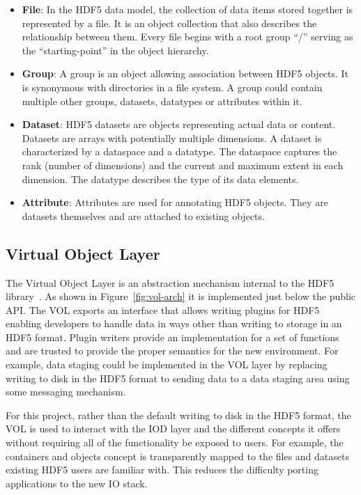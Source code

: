 \documentclass[conference]{IEEEtran}
\begin{document}
\begin{itemize}

\item
  \textbf{File}: In the HDF5 data model, the collection of data items stored
  together is represented by a file. It is an object collection that also
  describes the relationship between them. Every file begins with a root
  group ``/'' serving as the ``starting-point'' in the object hierarchy.

\item
  \textbf{Group}: A group is an object allowing association between HDF5
  objects. It is synonymous with directories in a file system. A group
  could contain multiple other groups, datasets, datatypes or attributes within
  it.

\item
  \textbf{Dataset}: HDF5 datasets are objects representing actual data
  or content. Datasets are arrays with potentially multiple dimensions. A
  dataset is characterized by a dataspace and a datatype. The dataspace
  captures the rank (number of dimensions) and the current and maximum
  extent in each dimension. The datatype describes the type of its data
  elements.

\item
  \textbf{Attribute}: Attributes are used for annotating HDF5 objects. They are
  datasets themselves and are attached to existing objects.

\end{itemize}

\subsection{Virtual Object Layer}
\label{virtual-object-layer}

The Virtual Object Layer is an abstraction mechanism internal to the HDF5
library~\cite{hdf5}. As shown in Figure~\ref{fig:vol-arch} it is implemented
just below the public API. The VOL exports an interface that allows writing
plugins for HDF5 enabling developers to handle data in ways other than writing
to storage in an HDF5 format.  Plugin writers provide an implementation for a
set of functions and are trusted to provide the proper semantics for the new
environment. For example, data staging could be implemented in the VOL layer by
replacing writing to disk in the HDF5 format to sending data to a data staging
area using some messaging mechanism.

For this project, rather than the default writing to disk in the HDF5 format,
the VOL is used to interact with the IOD layer and the different concepts it
offers without requiring all of the functionality be exposed to users. For
example, the containers and objects concept is transparently mapped to the
files and datasets existing HDF5 users are familiar with.  This reduces the
difficulty porting applications to the new IO stack.
\end{document}
